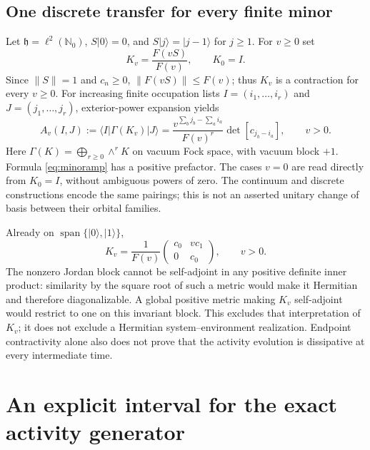 \documentclass[11pt,letterpaper]{article}
\numberwithin{equation}{section}
\theoremstyle{remark}
\newcommand{\N}{\mathbb N}
\newcommand{\ket}[1]{\lvert #1\rangle}
\newcommand{\bra}[1]{\langle #1\rvert}
\begin{document}
\subsection{One discrete transfer for every finite minor}
Let $\mathfrak h=\ell^2(\N_0)$, $S\ket0=0$, and
$S\ket j=\ket{j-1}$ for $j\ge1$. For $v\ge0$ set
\begin{equation}
 K_v=\frac{F(vS)}{F(v)},\qquad K_0=I. \label{eq:Kv}
\end{equation}
Since $\|S\|=1$ and $c_n\ge0$,
$\|F(vS)\|\le F(v)$; thus $K_v$ is a contraction for every $v\ge0$.
For increasing finite occupation lists $I=(i_1,\ldots,i_r)$ and
$J=(j_1,\ldots,j_r)$, exterior-power expansion yields
\begin{equation}
 A_v(I,J):=\bra I\Gamma(K_v)\ket J
 =\frac{v^{\sum_bj_b-\sum_ai_a}}{F(v)^r}
       \det[c_{j_b-i_a}],\qquad v>0. \label{eq:minoramp}
\end{equation}
Here $\Gamma(K)=\bigoplus_{r\ge0}\wedge^rK$ on vacuum Fock space,
with vacuum block $+1$. Formula \eqref{eq:minoramp} has a positive
prefactor. The cases $v=0$ are read directly from $K_0=I$, without
ambiguous powers of zero. The continuum and discrete constructions
encode the same pairings; this is not an asserted unitary change of
basis between their orbital families.

Already on $\operatorname{span}\{\ket0,\ket1\}$,
\begin{equation}
 K_v=\frac1{F(v)}
 \begin{pmatrix}c_0&vc_1\\0&c_0\end{pmatrix},\qquad v>0. \label{eq:jordan}
\end{equation}
The nonzero Jordan block cannot be self-adjoint in any positive definite
inner product: similarity by the square root of such a metric would
make it Hermitian and therefore diagonalizable. A global positive metric
making $K_v$ self-adjoint would restrict to one on this invariant block.
This excludes that interpretation of $K_v$; it does not exclude a
Hermitian system--environment realization. Endpoint contractivity alone
also does not prove that the activity evolution is dissipative at every
intermediate time.

\section{An explicit interval for the exact activity generator}
\label{sec:local}
\end{document}
